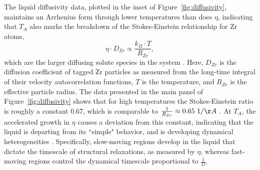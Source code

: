 \documentclass[aps,prl,preprint,showpacs,amsmath,floatfix,superscriptaddress]{revtex4}
\begin{document}
The liquid diffusivity data, plotted in the inset of
Figure~\ref{fig:diffusivity}, maintains an Arrhenius form through
lower temperatures than does $\eta$, indicating that $T_{A}$ also
marks the breakdown of the Stokes-Einstein relationship for Zr
atoms,
\begin{equation}\label{eq:stokes} \eta \cdot D_{Zr} \propto \frac{k_{B} \cdot T}{R_{Zr}}, \end{equation}
which are the larger diffusing solute species in the system
\cite{2009Cavagna,Inoue2008}. Here, $D_{Zr}$ is the diffusion
coefficient of tagged Zr particles as measured from the long-time
integral of their velocity autocorrelation functions, $T$ is the
temperature, and $R_{Zr}$ is the effective particle radius. The
data presented in the main panel of Figure~\ref{fig:diffusivity}
shows that for high temperatures the Stokes-Einstein ratio is
roughly a constant 0.67, which is comparable to $\frac{1}{R_{Zr}}
\approx 0.65\ 1/\AA$ \cite{radius}. At $T_{A}$, the accelerated
growth in $\eta$ causes a deviation from this constant, indicating
that the liquid is departing from its ``simple" behavior, and is
developing dynamical heterogeneities \cite{Karmakar2014,
Cicerone1996}. Specifically, slow-moving regions develop in the
liquid that dictate the timescale of structural relaxations, as
measured by $\eta$, whereas fast-moving regions control the
dynamical timescale proportional to $\frac{1}{D}$.
\end{document}
